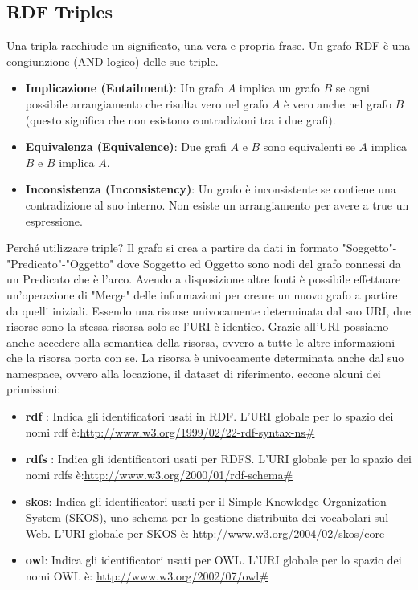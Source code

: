 \subsection{RDF Triples}
Una tripla racchiude un significato, una vera e propria frase. Un grafo RDF è una congiunzione (AND logico) delle sue triple.
\begin{itemize}
	\item \textbf{Implicazione (Entailment)}: Un grafo $A$ implica un grafo $B$ se ogni possibile arrangiamento che risulta vero nel grafo $A$ è vero anche nel grafo $B$ (questo significa che non esistono contradizioni tra i due grafi).
	\item \textbf{Equivalenza (Equivalence)}: Due grafi $A$ e $B$ sono equivalenti se $A$ implica $B$ e $B$ implica $A$.
	\item \textbf{Inconsistenza (Inconsistency)}: Un grafo è inconsistente se contiene una contradizione al suo interno. Non esiste un arrangiamento per avere a true un espressione.
\end{itemize}
Perché utilizzare triple?
\noindent Il grafo si crea a partire da dati in formato "Soggetto"-"Predicato"-"Oggetto" dove Soggetto ed Oggetto sono nodi del grafo connessi da un Predicato che è l'arco.\newline
Avendo a disposizione altre fonti è possibile effettuare un'operazione di "Merge" delle informazioni per creare un nuovo grafo
a partire da quelli iniziali. Essendo una risorse univocamente determinata dal suo URI, due risorse sono la stessa risorsa solo se l'URI è identico. Grazie all'URI possiamo anche accedere alla semantica della risorsa, ovvero a tutte le altre informazioni che la risorsa porta con se.\newline
La risorsa è univocamente determinata anche dal suo namespace, ovvero alla locazione, il dataset di riferimento, eccone alcuni dei primissimi:
\begin{itemize}
	\item \textbf{rdf} : Indica gli identificatori usati in RDF. L'URI globale per lo spazio dei nomi rdf è:\newline \url{http://www.w3.org/1999/02/22-rdf-syntax-ns#}
	\item \textbf{rdfs} : Indica gli identificatori usati per RDFS. L'URI globale per lo spazio dei nomi rdfs è:\newline \url{http://www.w3.org/2000/01/rdf-schema#}
	\item \textbf{skos}: Indica gli identificatori usati per il Simple Knowledge Organization System (SKOS), uno schema per la gestione distribuita dei vocabolari sul Web. L'URI globale per SKOS è:\newline
	\url{http://www.w3.org/2004/02/skos/core}
	\item \textbf{owl}: Indica gli identificatori usati per OWL. L'URI globale per lo spazio dei nomi OWL è:\newline
	\url{http://www.w3.org/2002/07/owl#}
\end{itemize}
